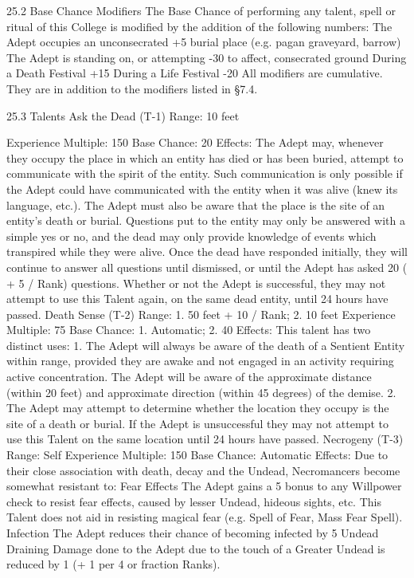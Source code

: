 \documentclass[a4paper]{article}
\begin{document}
\begin{multicols}{3}
25.2 Base Chance Modifiers
The Base Chance of performing any talent, spell or
ritual of this College is modified by the addition of
the following numbers:
The Adept occupies an unconsecrated
+5%
burial place (e.g. pagan graveyard, barrow)
The Adept is standing on, or attempting
-30%
to affect, consecrated ground
During a Death Festival
+15%
During a Life Festival
-20%
All modifiers are cumulative. They are in addition
to the modifiers listed in §7.4.

25.3 Talents
Ask the Dead (T-1)
Range: 10 feet

Experience Multiple: 150
Base Chance: 20%
Effects: The Adept may, whenever they occupy the
place in which an entity has died or has been buried, attempt to communicate with the spirit of the
entity. Such communication is only possible if the
Adept could have communicated with the entity
when it was alive (knew its language, etc.). The
Adept must also be aware that the place is the site
of an entity’s death or burial. Questions put to the
entity may only be answered with a simple yes or
no, and the dead may only provide knowledge of
events which transpired while they were alive.
Once the dead have responded initially, they will
continue to answer all questions until dismissed, or
until the Adept has asked 20 ( + 5 / Rank) questions. Whether or not the Adept is successful, they
may not attempt to use this Talent again, on the
same dead entity, until 24 hours have passed.
Death Sense (T-2)
Range: 1. 50 feet + 10 / Rank; 2. 10 feet
Experience Multiple: 75
Base Chance: 1. Automatic; 2. 40%
Effects: This talent has two distinct uses:
1. The Adept will always be aware of the death of a
Sentient Entity within range, provided they are
awake and not engaged in an activity requiring
active concentration. The Adept will be aware of
the approximate distance (within 20 feet) and approximate direction (within 45 degrees) of the
demise.
2. The Adept may attempt to determine whether
the location they occupy is the site of a death or
burial. If the Adept is unsuccessful they may not
attempt to use this Talent on the same location
until 24 hours have passed.
Necrogeny (T-3)
Range: Self
Experience Multiple: 150
Base Chance: Automatic
Effects: Due to their close association with death,
decay and the Undead, Necromancers become
somewhat resistant to:
Fear Effects The Adept gains a 5%
bonus to any Willpower check to resist fear effects,
caused by lesser Undead, hideous sights, etc. This
Talent does not aid in resisting magical fear (e.g.
Spell of Fear, Mass Fear Spell).
Infection The Adept reduces their chance of becoming infected by 5%
Undead Draining Damage done to the Adept due
to the touch of a Greater Undead is reduced by 1 (+
1 per 4 or fraction Ranks).


\end{multicols}
\end{document}
